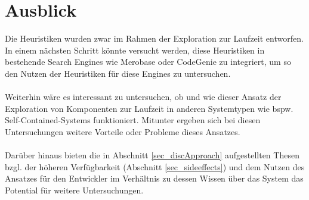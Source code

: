\section{Ausblick}
Die Heuristiken wurden zwar im Rahmen der Exploration zur Laufzeit entworfen. In einem nächsten Schritt könnte versucht werden, diese Heuristiken in bestehende Search \Gls{Engine}s wie Merobase oder CodeGenie zu integriert, um so den Nutzen der Heuristiken für diese \Gls{Engine}s zu untersuchen.
\\\\
Weiterhin wäre es interessant zu untersuchen, ob und wie dieser Ansatz der Exploration von Komponenten zur Laufzeit in anderen Systemtypen wie bspw. Self-Contained-Systems funktioniert. Mitunter ergeben sich bei diesen Untersuchungen weitere Vorteile oder Probleme dieses Ansatzes.
\\\\
Darüber hinaus bieten die in Abschnitt \ref{sec_discApproach} aufgestellten Thesen bzgl. der höheren Verfügbarkeit (Abschnitt \ref{sec_sideeffects}) und dem Nutzen des Ansatzes für den Entwickler im Verhältnis zu dessen Wissen über das System das Potential für weitere Untersuchungen.
